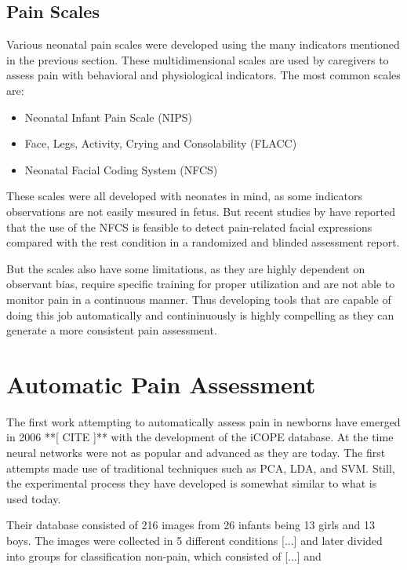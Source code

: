 \subsection{Pain Scales}

Various neonatal pain scales were developed using the many indicators mentioned in the previous section. These multidimensional scales are used by caregivers to assess pain with behavioral and physiological indicators. The most common scales are:

\begin{itemize}
    \item Neonatal Infant Pain Scale (NIPS)
    \item Face, Legs, Activity, Crying and Consolability (FLACC)
    \item Neonatal Facial Coding System (NFCS)
\end{itemize}

These scales were all developed with neonates in mind, as some indicators observations are not easily mesured in fetus. But recent studies by \citeauthor{bernardes2018feasibility} have reported that the use of the NFCS is feasible to detect pain-related facial expressions compared with the rest condition in a randomized and blinded assessment report.

But the scales also have some limitations, as they are highly dependent on observant bias, require specific training for proper utilization and are not able to monitor pain in a continuous manner. Thus developing tools that are capable of doing this job automatically and contininuously is highly compelling as they can generate a more consistent pain assessment.

\section{Automatic Pain Assessment}

The first work attempting to automatically assess pain in newborns have emerged in 2006 **[  CITE  ]** with the development of the iCOPE database. At the time neural networks were not as popular and advanced as they are today. The first attempts made use of traditional techniques such as PCA, LDA, and SVM. Still, the experimental process they have developed is somewhat similar to what is used today. 

Their database consisted of 216 images from 26 infants being 13 girls and 13 boys. The images were collected in 5 different conditions [...] and later divided into groups for classification non-pain, which consisted of [...] and 

